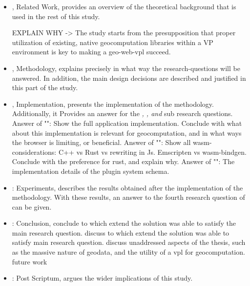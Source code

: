 \begin{itemize}[ ]
  \item {}, Related Work, provides an overview of the theoretical background that is used in the rest of this study.
  
  \begin{note}
    EXPLAIN WHY -> The study starts from the presupposition that proper utilization of existing, native geocomputation libraries within a VP environment is key to making a geo-web-vpl succeed. 
  \end{note}

  \item {}, Methodology, explains precisely in what way the research-questions will be answered. In addition, the main design decisions are described and justified in this part of the study.

  \item {}, Implementation, presents the implementation of the methodology. Additionally, it Provides an answer for the \textit{\mySubRQOneTitle, \mySubRQTwoTitle , and \mySubRQThreeTitle} sub research questions. 
  \subitem Answer of "\mySubRQOneTitle": Show the full application implementation. Conclude with what about this implementation is relevant for geocomputation, and in what ways the browser is limiting, or beneficial. 
  \subitem Answer of "\mySubRQTwoTitle": Show all wasm-considerations: C++ vs Rust vs rewriting in Js. Emscripten vs wasm-bindgen. Conclude with the preference for rust, and explain why.
  \subitem Answer of "\mySubRQThreeTitle": The implementation details of the plugin system schema. 
  
  \item {}: Experiments, describes the results obtained after the implementation of the methodology. With these results, an answer to the fourth research question of \mySubRQFourTitle can be given. 

  \item {}: Conclusion, 
  \subitem conclude to which extend the solution was able to satisfy the main research question. 
  \subitem discuss to which extend the solution was able to satisfy main research question.
  \subitem discuss unaddressed aspects of the thesis, such as the massive nature of geodata, and the utility of a vpl for geocomputation.
  \subitem future work

  \item {}: Post Scriptum, argues the wider implications of this study. 

\end{itemize}
